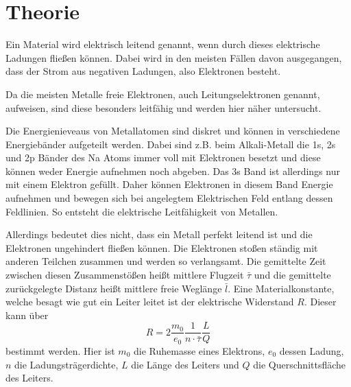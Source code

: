 \section{Theorie}
\label{sec:Theorie}






Ein Material wird elektrisch leitend genannt, wenn durch dieses elektrische Ladungen fließen können.
Dabei wird in den meisten Fällen davon ausgegangen, dass der Strom aus negativen Ladungen, also Elektronen besteht.

Da die meisten Metalle freie Elektronen, auch Leitungselektronen genannt, aufweisen, sind diese besonders leitfähig und werden hier näher untersucht.

Die Energienieveaus von Metallatomen sind diskret und können in verschiedene Energiebänder aufgeteilt werden. 
Dabei sind z.B. beim Alkali-Metall die 1s, 2s und 2p Bänder des Na Atoms immer voll mit Elektronen besetzt und diese können weder Energie aufnehmen noch abgeben.
Das 3s Band ist allerdings nur mit einem Elektron gefüllt. 
Daher können Elektronen in diesem Band Energie aufnehmen und bewegen sich bei angelegtem Elektrischen Feld entlang dessen Feldlinien.
So entsteht die elektrische Leitfähigkeit von Metallen. \cite{V311}

Allerdings bedeutet dies nicht, dass ein Metall perfekt leitend ist und die Elektronen ungehindert fließen können.
Die Elektronen stoßen ständig mit anderen Teilchen zusammen und werden so verlangsamt.
Die gemittelte Zeit zwischen diesen Zusammenstößen heißt mittlere Flugzeit $\bar{\tau}$ und die gemittelte zurückgelegte Distanz heißt mittlere freie Weglänge $\bar{l}$.
Eine Materialkonstante, welche besagt wie gut ein Leiter leitet ist der elektrische Widerstand $R$.
Dieser kann über
\begin{equation}
    R = 2\frac{m_0}{e_0}\frac{1}{n \cdot \bar{\tau}}\frac{L}{Q}
    \label{eq:widerstand}
\end{equation}
bestimmt werden. 
Hier ist $m_0$ die Ruhemasse eines Elektrons, $e_0$ dessen Ladung, $n$ die Ladungsträgerdichte, $L$ die Länge des Leiters und $Q$ die Querschnittsfläche des Leiters. \cite{V311}

